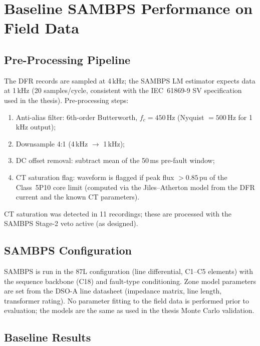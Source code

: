 \documentclass[journal]{IEEEtran}
\begin{document}
\section{Baseline SAMBPS Performance on Field Data}
\label{sec:baseline}

\subsection{Pre-Processing Pipeline}

The DFR records are sampled at 4\,kHz; the SAMBPS LM estimator expects
data at 1\,kHz (20 samples/cycle, consistent with the IEC~61869-9 SV
specification used in the thesis).  Pre-processing steps:
\begin{enumerate}
  \item Anti-alias filter: 6th-order Butterworth, $f_c = 450$\,Hz
        (Nyquist $= 500$\,Hz for 1\,kHz output);
  \item Downsample 4:1 (4\,kHz $\to$ 1\,kHz);
  \item DC offset removal: subtract mean of the 50\,ms pre-fault window;
  \item CT saturation flag: waveform is flagged if peak flux $> 0.85$\,pu
        of the Class~5P10 core limit (computed via the Jiles--Atherton model
        from the DFR current and the known CT parameters).
\end{enumerate}
CT saturation was detected in 11 recordings; these are processed with the
SAMBPS Stage-2 veto active (as designed).

\subsection{SAMBPS Configuration}

SAMBPS is run in the 87L configuration (line differential, C1--C5 elements)
with the sequence backbone (C18) and fault-type conditioning.  Zone model
parameters are set from the DSO-A line datasheet (impedance matrix,
line length, transformer rating).  No parameter fitting to the field data
is performed prior to evaluation; the models are the same as used in the
thesis Monte Carlo validation.

\subsection{Baseline Results}
\end{document}
